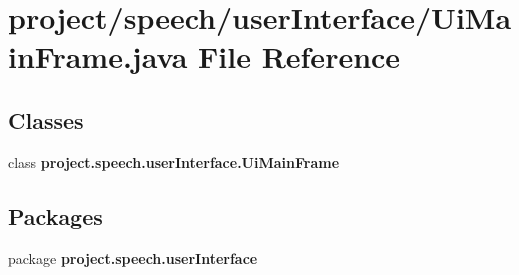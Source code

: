 \section{project/speech/user\+Interface/\+Ui\+Main\+Frame.java File Reference}
\label{_ui_main_frame_8java}
\subsection*{Classes}
\begin{DoxyCompactItemize}
\item 
class {\bf project.\+speech.\+user\+Interface.\+Ui\+Main\+Frame}
\end{DoxyCompactItemize}
\subsection*{Packages}
\begin{DoxyCompactItemize}
\item 
package {\bf project.\+speech.\+user\+Interface}
\end{DoxyCompactItemize}
